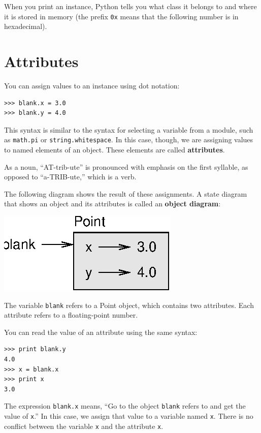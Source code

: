 \documentclass[10pt]{book}
\begin{document}
{

When you print an instance, Python tells you what class it
belongs to and where it is stored in memory (the prefix
{\tt 0x} means that the following number is in hexadecimal).



\section{Attributes}


You can assign values to an instance using dot notation:

\beforeverb
\begin{verbatim}
>>> blank.x = 3.0
>>> blank.y = 4.0
\end{verbatim}
\afterverb
%
This syntax is similar to the syntax for selecting a variable from a
module, such as {\tt math.pi} or {\tt string.whitespace}.  In this case,
though, we are assigning values to named elements of an object.
These elements are called {\bf attributes}.

As a noun, ``AT-trib-ute'' is pronounced with emphasis on the first
syllable, as opposed to ``a-TRIB-ute,'' which is a verb.

The following diagram shows the result of these assignments.
A state diagram that shows an object and its attributes is
called an {\bf object diagram}:


\beforefig
\centerline{\includegraphics{figs/point.eps}}
\afterfig

The variable {\tt blank} refers to a Point object, which
contains two attributes.  Each attribute refers to a
floating-point number.

You can read the value of an attribute using the same syntax:

\beforeverb
\begin{verbatim}
>>> print blank.y
4.0
>>> x = blank.x
>>> print x
3.0
\end{verbatim}
\afterverb
%
The expression {\tt blank.x} means, ``Go to the object {\tt blank}
refers to and get the value of {\tt x}.'' In this case, we assign that
value to a variable named {\tt x}.  There is no conflict between
the variable {\tt x} and the attribute {\tt x}.

}
\end{document}
